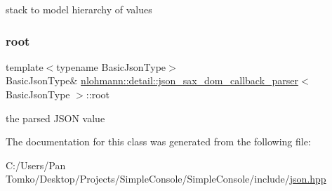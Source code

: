 stack to model hierarchy of values 

\mbox{\label{classnlohmann_1_1detail_1_1json__sax__dom__callback__parser_a7b12037ca38be3ddec09c42bd71080cc}} 
\subsubsection{\texorpdfstring{root}{root}}
{\footnotesize\ttfamily template$<$typename Basic\+Json\+Type$>$ \\
Basic\+Json\+Type\& \mbox{\hyperlink{classnlohmann_1_1detail_1_1json__sax__dom__callback__parser}{nlohmann\+::detail\+::json\+\_\+sax\+\_\+dom\+\_\+callback\+\_\+parser}}$<$ Basic\+Json\+Type $>$\+::root\hspace{0.3cm}{\ttfamily [private]}}



the parsed J\+S\+ON value 



The documentation for this class was generated from the following file\+:\begin{DoxyCompactItemize}
\item 
C\+:/\+Users/\+Pan Tomko/\+Desktop/\+Projects/\+Simple\+Console/\+Simple\+Console/include/\mbox{\hyperlink{json_8hpp}{json.\+hpp}}\end{DoxyCompactItemize}
